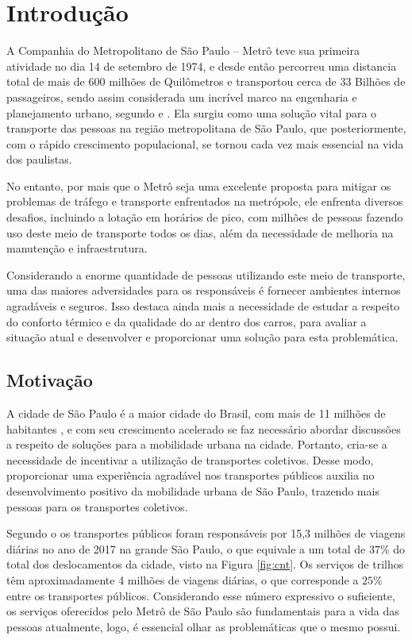 \documentclass[acronym,symbols,table]{fei}
\begin{document}
\chapter{Introdução}

A Companhia do Metropolitano de São Paulo – Metrô teve sua primeira atividade no dia 14 de setembro de 1974, e desde então percorreu uma distancia total de mais de 600 milhões de Quilômetros e transportou cerca de 33 Bilhões de passageiros, sendo assim considerada um incrível marco na engenharia e planejamento urbano, segundo \textcite{inicio} e \textcite{g1}.
Ela surgiu como uma solução vital para o transporte das pessoas na região metropolitana de São Paulo, que posteriormente, com o rápido crescimento populacional, se tornou cada vez mais essencial na vida dos paulistas.

No entanto, por mais que o Metrô seja uma excelente proposta para mitigar os problemas de tráfego e transporte enfrentados na metrópole, ele enfrenta diversos desafios, incluindo a lotação em horários de pico, com milhões de pessoas fazendo uso deste meio de transporte todos os dias, além da necessidade de melhoria na manutenção e infraestrutura.

Considerando a enorme quantidade de pessoas utilizando este meio de transporte, uma das maiores adversidades para os responsáveis é fornecer ambientes internos agradáveis e seguros. Isso destaca ainda mais a necessidade de estudar a respeito do conforto térmico e da qualidade do ar dentro dos carros, para avaliar a situação atual e desenvolver e proporcionar uma solução para esta problemática.

\section{Motivação}

A cidade de São Paulo é a maior cidade do Brasil, com mais de 11 milhões de habitantes \cite{IBGE}, e com seu crescimento acelerado se faz necessário abordar discussões a respeito de soluções para a mobilidade urbana na cidade. Portanto, cria-se a necessidade de incentivar a utilização de transportes coletivos. Desse modo, proporcionar uma experiência agradável nos transportes públicos auxilia no desenvolvimento positivo da mobilidade urbana de São Paulo, trazendo mais pessoas para os transportes coletivos.

Segundo o \textcite{cnt} os transportes públicos foram responsáveis por 15,3 milhões de viagens diárias no ano de 2017 na grande São Paulo, o que equivale a um total de $37\%$ do total dos deslocamentos da cidade, visto na Figura \ref{fig:cnt}. Os serviços de trilhos têm aproximadamente 4 milhões de viagens diárias, o que corresponde a $25\%$ entre os transportes públicos. Considerando esse número expressivo o suficiente, os serviços oferecidos pelo Metrô de São Paulo são fundamentais para a vida das pessoas atualmente, logo, é essencial olhar as problemáticas que o mesmo possui.
\end{document}
